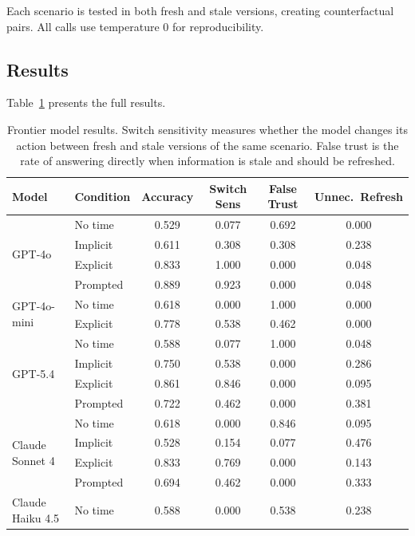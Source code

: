 \documentclass[11pt,a4paper]{article}
\begin{document}
Each scenario is tested in both fresh and stale versions, creating counterfactual pairs.
All calls use temperature 0 for reproducibility.

\subsection{Results}

Table~\ref{tab:frontier} presents the full results.

\begin{table}[h]
\centering
\caption{Frontier model results. Switch sensitivity measures whether the model changes its action between fresh and stale versions of the same scenario. False trust is the rate of answering directly when information is stale and should be refreshed.}
\label{tab:frontier}
\small
\begin{tabular}{llcccc}
\toprule
\textbf{Model} & \textbf{Condition} & \textbf{Accuracy} & \textbf{Switch Sens} & \textbf{False Trust} & \textbf{Unnec.\ Refresh} \\
\midrule
\multirow{4}{*}{GPT-4o}
  & No time   & 0.529 & 0.077 & 0.692 & 0.000 \\
  & Implicit  & 0.611 & 0.308 & 0.308 & 0.238 \\
  & Explicit  & 0.833 & 1.000 & 0.000 & 0.048 \\
  & Prompted  & 0.889 & 0.923 & 0.000 & 0.048 \\
\midrule
\multirow{2}{*}{GPT-4o-mini}
  & No time   & 0.618 & 0.000 & 1.000 & 0.000 \\
  & Explicit  & 0.778 & 0.538 & 0.462 & 0.000 \\
\midrule
\multirow{4}{*}{GPT-5.4}
  & No time   & 0.588 & 0.077 & 1.000 & 0.048 \\
  & Implicit  & 0.750 & 0.538 & 0.000 & 0.286 \\
  & Explicit  & 0.861 & 0.846 & 0.000 & 0.095 \\
  & Prompted  & 0.722 & 0.462 & 0.000 & 0.381 \\
\midrule
\multirow{4}{*}{Claude Sonnet 4}
  & No time   & 0.618 & 0.000 & 0.846 & 0.095 \\
  & Implicit  & 0.528 & 0.154 & 0.077 & 0.476 \\
  & Explicit  & 0.833 & 0.769 & 0.000 & 0.143 \\
  & Prompted  & 0.694 & 0.462 & 0.000 & 0.333 \\
\midrule
\multirow{4}{*}{Claude Haiku 4.5}
  & No time   & 0.588 & 0.000 & 0.538 & 0.238 \\

\end{tabular}
\end{table}
\end{document}
